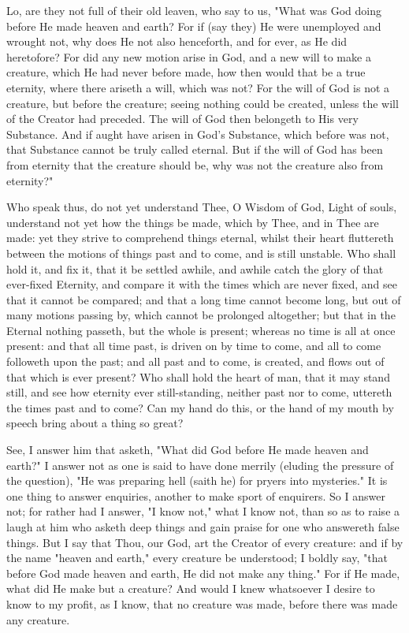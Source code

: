 \documentclass[b5paper,openright,12pt,twoside]{book}
\begin{document}
Lo, are they not full of their old leaven, who say to us, "What was
God doing before He made heaven and earth? For if (say they) He were
unemployed and wrought not, why does He not also henceforth, and for
ever, as He did heretofore? For did any new motion arise in God, and a
new will to make a creature, which He had never before made, how then
would that be a true eternity, where there ariseth a will, which was
not? For the will of God is not a creature, but before the creature;
seeing nothing could be created, unless the will of the Creator had
preceded. The will of God then belongeth to His very Substance. And
if aught have arisen in God's Substance, which before was not, that
Substance cannot be truly called eternal. But if the will of God has
been from eternity that the creature should be, why was not the creature
also from eternity?"

Who speak thus, do not yet understand Thee, O Wisdom of God, Light of
souls, understand not yet how the things be made, which by Thee, and
in Thee are made: yet they strive to comprehend things eternal, whilst
their heart fluttereth between the motions of things past and to come,
and is still unstable. Who shall hold it, and fix it, that it be settled
awhile, and awhile catch the glory of that ever-fixed Eternity, and
compare it with the times which are never fixed, and see that it cannot
be compared; and that a long time cannot become long, but out of many
motions passing by, which cannot be prolonged altogether; but that in
the Eternal nothing passeth, but the whole is present; whereas no time
is all at once present: and that all time past, is driven on by time to
come, and all to come followeth upon the past; and all past and to come,
is created, and flows out of that which is ever present? Who shall hold
the heart of man, that it may stand still, and see how eternity ever
still-standing, neither past nor to come, uttereth the times past and to
come? Can my hand do this, or the hand of my mouth by speech bring about
a thing so great?

See, I answer him that asketh, "What did God before He made heaven and
earth?" I answer not as one is said to have done merrily (eluding the
pressure of the question), "He was preparing hell (saith he) for pryers
into mysteries." It is one thing to answer enquiries, another to make
sport of enquirers. So I answer not; for rather had I answer, "I know
not," what I know not, than so as to raise a laugh at him who asketh
deep things and gain praise for one who answereth false things. But I
say that Thou, our God, art the Creator of every creature: and if by
the name "heaven and earth," every creature be understood; I boldly say,
"that before God made heaven and earth, He did not make any thing." For
if He made, what did He make but a creature? And would I knew whatsoever
I desire to know to my profit, as I know, that no creature was made,
before there was made any creature.
\end{document}
